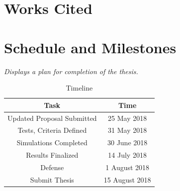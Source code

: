 \documentclass {article}
\newcommand{\sechint}[1]{\small{\emph{#1}} \bigskip}
\begin{document}
\pagebreak
\section{Works Cited}
\printbibliography[title={\ }]

\pagebreak
\section{Schedule and Milestones}{\sechint{Displays a plan for completion of the thesis.}}

\begin{table}[!ht]
	\centering
	\begin{tabular}{c|c}
		\hline
		Task & Time \\ \hline \hline
		Updated Proposal Submitted & 25 May 2018 \\ \hline
		Tests, Criteria Defined & 31 May 2018 \\ \hline
		Simulations Completed & 30 June 2018 \\ \hline
		Results Finalized & 14 July 2018 \\ \hline
		Defense & 1 August 2018 \\ \hline
		Submit Thesis & 15 August 2018 \\ \hline
	\end{tabular}
	\caption{Timeline}
\end{table}
\end{document}
